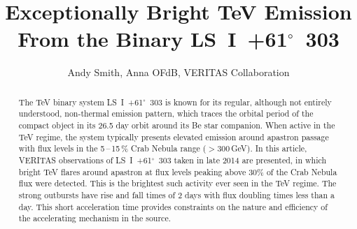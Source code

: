 \documentclass[preprint2]{aastex}
\newcommand{\tapp}{\raisebox{0.5ex}{\texttildelow}}
\newcommand{\lsi}{LS~I~+61$^{\circ}$~303}
\newcommand{\gev}{\,GeV}
\begin{document}

\title{Exceptionally Bright TeV Emission From the Binary \lsi{}}


\author{
Andy Smith,
Anna OFdB,
VERITAS Collaboration
}




\begin{abstract}
The TeV binary system \lsi{} is known for its regular, although not entirely understood, non-thermal emission pattern, which traces the orbital period of the compact object in its 26.5 day orbit around its Be star companion. When active in the TeV regime, the system typically presents elevated emission around apastron passage with flux levels in the 5\,--\,15\,\% Crab Nebula range ($>300$\gev{}). In this article, VERITAS observations of \lsi{} taken in late 2014 are presented, in which bright TeV flares around apastron at flux levels peaking above $30\%$ of the Crab Nebula flux were detected. This is the brightest such activity ever seen in the TeV regime. The strong outbursts have rise and fall times of \tapp{}$2$ days with flux doubling times less than a day. This short acceleration time provides constraints on the nature and efficiency of the accelerating mechanism in the source.
\end{abstract}
\end{document}
